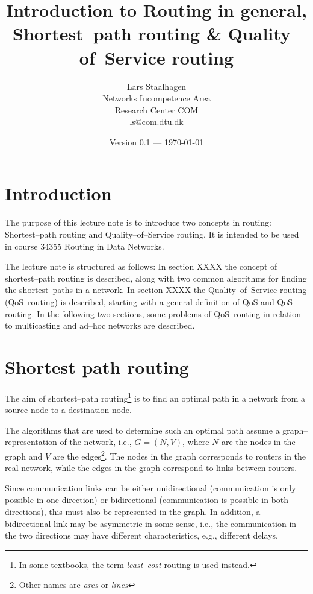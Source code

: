 \documentclass[a4paper]{article}
\newcommand{\ie}{i.e.,\xspace}
\newcommand{\eg}{e.g.,\xspace}
\begin{document}
\title{Introduction to Routing in general,\\Shortest--path routing \& Quality--of--Service routing}
\author{Lars Staalhagen \\ Networks Incompetence Area \\ Research Center
  COM \\ ls@com.dtu.dk }
\date{\small{}Version 0.1 --- \today}
\maketitle

\section{Introduction}
The purpose of this lecture note is to introduce two concepts in
routing: Shortest--path routing and Quality--of--Service routing. It
is intended to be used in course 34355 Routing in Data Networks.

The lecture note is structured as follows: In section XXXX the
concept of shortest--path routing is described, along with two
common algorithms for finding the shortest--paths in a network. In
section XXXX the Quality--of--Service routing (QoS--routing) is
described, starting with a general definition of QoS and QoS
routing. In the following two sections, some problems of
QoS--routing in relation to multicasting and ad--hoc networks are
described.

% 

\section{\label{sec:shortestpath}Shortest path routing}
The aim of shortest--path routing\footnote{In some textbooks, the term
  \emph{least--cost} routing is used instead.} is to find an optimal
path in a network from a source node to a destination node.

The algorithms that are used to determine such an optimal path assume a
graph--representation of the network, i.e., $G = (N,V)$, where $N$
are the nodes in the graph and $V$ are the edges\footnote{Other
names are \emph{arcs} or \emph{lines}}. The nodes in the graph corresponds to routers in the real network, while the edges in the graph correspond to links between routers. 

Since communication links can be either unidirectional (communication is only possible in one direction) or bidirectional (communication is possible in both directions), this must also be represented in the graph. In addition, a bidirectional link may be asymmetric in some sense, \ie the communication in the two directions may have different characteristics, \eg different delays.
\end{document}
